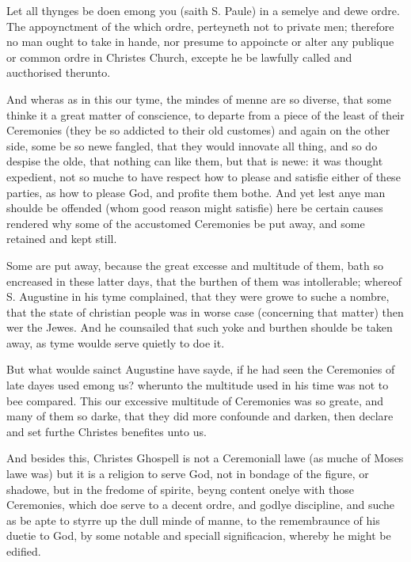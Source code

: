 Let all thynges be doen emong you (saith S. Paule)
in a semelye and dewe ordre. The appoynctment of the which ordre, perteyneth
not to private men; therefore no man ought to take in hande, nor presume
to appoincte or alter any publique or common ordre in Christes Church,
excepte he be lawfully called and aucthorised therunto.

And wheras as in this our tyme, the mindes of menne
are so diverse, that some thinke it a great matter of conscience, to
departe from a piece of the least of their Ceremonies (they be so addicted
to their old customes) and again on the other side, some be so newe
fangled, that they would innovate all thing, and so do despise the olde,
that nothing can like them, but that is newe: it was thought expedient,
not so muche to have respect how to please and satisfie either of these
parties, as how to please God, and profite them bothe. And yet lest
anye man shoulde be offended (whom good reason might satisfie) here
be certain causes rendered why some of the accustomed Ceremonies be
put away, and some retained and kept still.

Some are put away, because the great excesse and
multitude of them, bath so encreased in these latter days, that the
burthen of them was intollerable; whereof S. Augustine in his tyme complained,
that they were growe to suche a nombre, that the state of christian
people was in worse case (concerning that matter) then wer the Jewes.
And he counsailed that such yoke and burthen shoulde be taken away,
as tyme woulde serve quietly to doe it.

But what woulde sainct Augustine have sayde, if he
had seen the Ceremonies of late dayes used emong us? wherunto the multitude
used in his time was not to bee compared. This our excessive multitude
of Ceremonies was so greate, and many of them so darke, that they did
more confounde and darken, then declare and set furthe Christes benefites
unto us.

And besides this, Christes Ghospell is not a Ceremoniall
lawe (as muche of Moses lawe was) but it is a religion to serve God,
not in bondage of the figure, or shadowe, but in the fredome of spirite,
beyng content onelye with those Ceremonies, which doe serve to a decent
ordre, and godlye discipline, and suche as be apte to styrre up the
dull minde of manne, to the remembraunce of his duetie to God, by some
notable and speciall significacion, whereby he might be edified.

